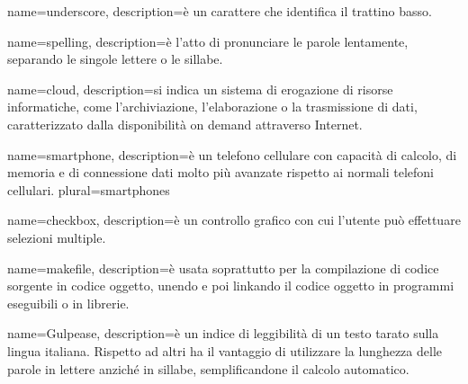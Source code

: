  {
	name=underscore,
	description={è un carattere che identifica il trattino basso.}
}

 {
	name=spelling,
	description={è l'atto di pronunciare le parole lentamente, separando le singole lettere o le sillabe.}
}

 {
	name=cloud,
	description={si indica un sistema di erogazione di risorse informatiche, come l'archiviazione, l'elaborazione o la trasmissione di dati, caratterizzato dalla disponibilità on demand attraverso Internet.}
}

 {
	name=smartphone,
	description={è un telefono cellulare con capacità di calcolo, di memoria e di connessione dati molto più avanzate rispetto ai normali telefoni cellulari.}
	plural=smartphones
}

 {
	name=checkbox,
	description={è un controllo grafico con cui l'utente può effettuare selezioni multiple.}
}


 {
	name=makefile,
	description={è usata soprattutto per la compilazione di codice sorgente in codice oggetto, unendo e poi linkando il codice oggetto in programmi eseguibili o in librerie.}
}

 {
	name=Gulpease,
	description={è un indice di leggibilità di un testo tarato sulla lingua italiana. Rispetto ad altri ha il vantaggio di utilizzare la lunghezza delle parole in lettere anziché in sillabe, semplificandone il calcolo automatico.}
}
